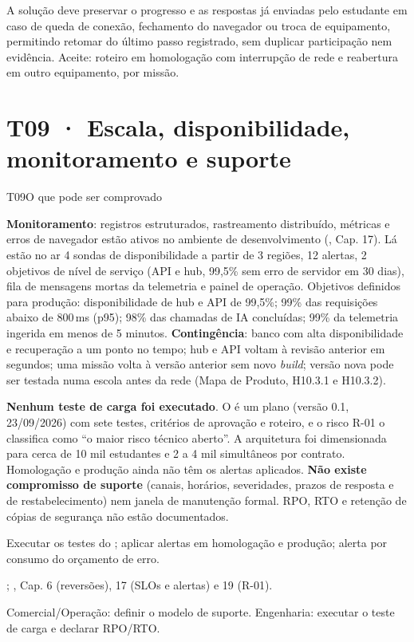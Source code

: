 \begin{paraotr}
A solução deve preservar o progresso e as respostas já enviadas pelo
estudante em caso de queda de conexão, fechamento do navegador ou troca de
equipamento, permitindo retomar do último passo registrado, sem duplicar
participação nem evidência. Aceite: roteiro em homologação com interrupção de
rede e reabertura em outro equipamento, por missão.
\end{paraotr}

\section{T09 · Escala, disponibilidade, monitoramento e suporte}
\label{sec:t09}

\begin{resposta}{T09}{O que pode ser comprovado}{\parcial}
\begin{campos}
  \item[Hoje] \textbf{Monitoramento}: registros estruturados, rastreamento
    distribuído, métricas e erros de navegador estão ativos no ambiente de
    desenvolvimento (, Cap. 17). Lá estão no ar 4 sondas de
    disponibilidade a partir de 3 regiões, 12 alertas, 2 objetivos de nível de
    serviço (API e hub, 99,5\% sem erro de servidor em 30 dias), fila de
    mensagens mortas da telemetria e painel de operação. Objetivos definidos
    para produção: disponibilidade de hub e API de 99,5\%; 99\% das
    requisições abaixo de 800\,ms (p95); 98\% das chamadas de IA concluídas;
    99\% da telemetria ingerida em menos de 5 minutos. \textbf{Contingência}:
    banco com alta disponibilidade e recuperação a um ponto no tempo; hub e
    API voltam à revisão anterior em segundos; uma missão volta à versão
    anterior sem novo \emph{build}; versão nova pode ser testada numa escola
    antes da rede (Mapa de Produto, H10.3.1 e H10.3.2).
  \item[Limitações] \textbf{Nenhum teste de carga foi executado}. O
     é um plano (versão 0.1, 23/09/2026) com sete testes,
    critérios de aprovação e roteiro, e o risco R-01 o classifica como ``o
    maior risco técnico aberto''. A arquitetura foi dimensionada para cerca de
    10 mil estudantes e 2 a 4 mil simultâneos por contrato. Homologação e
    produção ainda não têm os alertas aplicados. \textbf{Não existe
    compromisso de suporte} (canais, horários, severidades, prazos de resposta
    e de restabelecimento) nem janela de manutenção formal. RPO, RTO e
    retenção de cópias de segurança não estão documentados.
  \item[Planejado] Executar os testes do ; aplicar alertas em
    homologação e produção; alerta por consumo do orçamento de erro.
  \item[Evidência] ; , Cap. 6 (reversões), 17
    (SLOs e alertas) e 19 (R-01).
  \item[Lacuna] Comercial/Operação: definir o modelo de suporte. Engenharia:
    executar o teste de carga e declarar RPO/RTO.
\end{campos}
\end{resposta}


